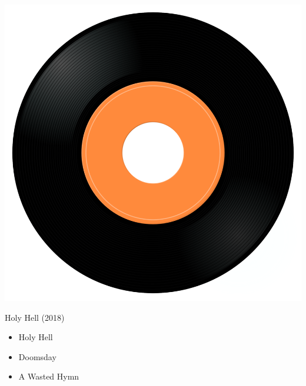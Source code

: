 \begin{minipage}[t]{0.25\textwidth}\vspace{0pt}
\captionsetup{type=figure}
\includegraphics[width=\textwidth]{Images/cover.png}
\caption*{Holy Hell (2018)}
\end{minipage}
\begin{minipage}[t]{0.25\textwidth}\vspace{0pt}
\begin{itemize}[nosep,leftmargin=1em,labelwidth=*,align=left]
	\setlength{\itemsep}{0pt}
	\item Holy Hell
	\item Doomsday
	\item A Wasted Hymn
\end{itemize}
\end{minipage}

